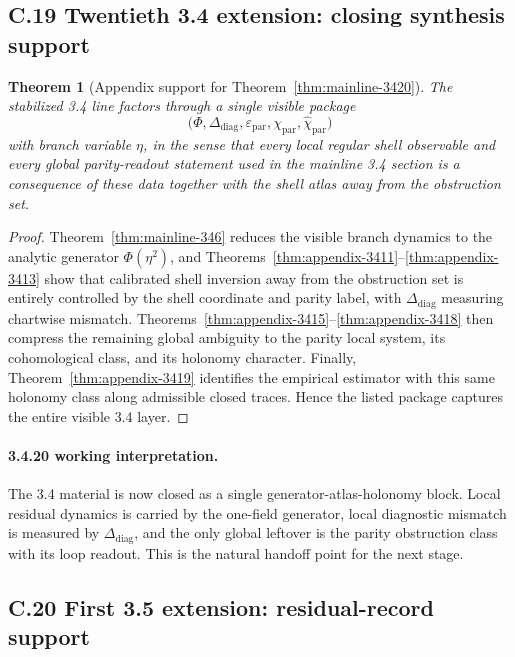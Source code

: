 \documentclass[12pt,a4paper]{article}
\newtheorem{theorem}{Theorem}[section]
\begin{document}
\subsection*{C.19 Twentieth 3.4 extension: closing synthesis support}

\begin{theorem}[Appendix support for Theorem~\ref{thm:mainline-3420}]
\label{thm:appendix-3420}
The stabilized 3.4 line factors through a single visible package
\[
 \bigl(\Phi,\Delta_{\mathrm{diag}},\varepsilon_{\mathrm{par}},\chi_{\mathrm{par}},\widehat\chi_{\mathrm{par}}\bigr)
\]
with branch variable $\eta$, in the sense that every local regular shell observable and every global parity-readout statement used in the mainline 3.4 section is a consequence of these data together with the shell atlas away from the obstruction set.
\end{theorem}

\begin{proof}
Theorem~\ref{thm:mainline-346} reduces the visible branch dynamics to the analytic generator $\Phi(\eta^2)$, and Theorems~\ref{thm:appendix-3411}--\ref{thm:appendix-3413} show that calibrated shell inversion away from the obstruction set is entirely controlled by the shell coordinate and parity label, with $\Delta_{\mathrm{diag}}$ measuring chartwise mismatch. Theorems~\ref{thm:appendix-3415}--\ref{thm:appendix-3418} then compress the remaining global ambiguity to the parity local system, its cohomological class, and its holonomy character. Finally, Theorem~\ref{thm:appendix-3419} identifies the empirical estimator with this same holonomy class along admissible closed traces. Hence the listed package captures the entire visible 3.4 layer.
\end{proof}

\paragraph{3.4.20 working interpretation.}
The 3.4 material is now closed as a single generator-atlas-holonomy block. Local residual dynamics is carried by the one-field generator, local diagnostic mismatch is measured by $\Delta_{\mathrm{diag}}$, and the only global leftover is the parity obstruction class with its loop readout. This is the natural handoff point for the next stage.


\subsection*{C.20 First 3.5 extension: residual-record support}
\end{document}
